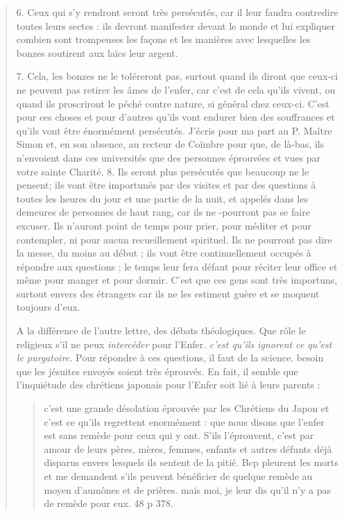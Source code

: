 \begin{quote}
\begin{Synthesis}
\end{Synthesis}
6. Ceux qui s'y rendront seront très persécutés, car il leur faudra
contredire toutes leurs sectes : ils devront manifester devant le
monde et lui expliquer combien sont trompeuses les façons et les
manières avec lesquelles les bonzes soutirent aux laïcs leur argent.


7. Cela, les bonzes ne le toléreront pas, surtout quand ils
diront que ceux-ci ne peuvent pas retirer les âmes de l'enfer, car
c'est de cela qu'ils vivent, ou quand ils proscriront le péché contre
nature, si général chez ceux-ci. C'est pour ces choses et pour
d'autres qu'ils vont endurer bien des souffrances et qu'ils vont être
énormément persécutés. J'écris pour ma part au P. Maître Simon
et, en son absence, au recteur de Coïmbre pour que, de là-bas, ils
n'envoient dans ces universités que des personnes éprouvées et vues
par votre sainte Charité. 
8. Ils seront plus persécutés que beaucoup ne le pensent; ils vont
être importunés par des visites et par des questions à toutes les heures
du jour et une partie de la nuit, et appelés dans les demeures
de personnes de haut rang, car ils ne -pourront pas se faire excuser.
Ils n'auront point de temps pour prier, pour méditer et pour
contempler, ni pour aucun recueillement spirituel. Ils ne pourront
pas dire la messe, du moins au début ; ils vont être continuellement
occupés à répondre aux questions ; le temps leur fera défaut pour
réciter leur office et même pour manger et pour dormir. C'est que
ces gens sont très importuns, surtout envers des étrangers car ils
ne les estiment guère et se moquent toujours d'eux.
\begin{Synthesis}
A la différence de l'autre lettre, des débats théologiques. Que rôle le religieux s'il ne peux \textit{intercéder} pour l'Enfer. \textit{c'est qu'ils ignorent ce qu'est le purgatoire.} Pour répondre à ces questions, il faut de la science. besoin que les jésuites envoyés soient très éprouvés.
En fait, il semble que l'inquiétude des chrétiens japonais pour l'Enfer soit lié à leurs parents : 
\begin{quote}
    c'est une grande désolation éprouvée par les Chrétiens du Japon et c'est ce qu'ils regrettent enormément : que nous disons que l'enfer est sans remède pour ceux qui y ont. S'ils l'éprouvent, c'est par amour de leurs pères, mères, femmes, enfants et autres défunts déjà disparus envers lesquels ils sentent de la pitié. Bcp pleurent les morts et me demandent s'ils peuvent bénéficier de quelque remède au moyen d'aumônes et de prières. mais moi, je leur dis qu'il n'y a pas de remède pour eux. 48 p 378.
    

\end{quote}
\end{Synthesis}
\end{quote}
